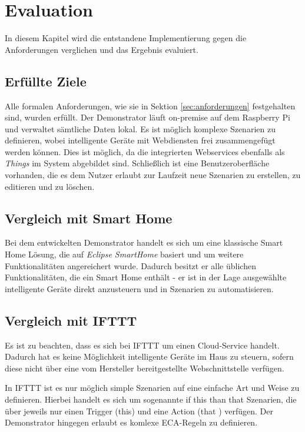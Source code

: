 \chapter{Evaluation}
\label{chap:eval}
In diesem Kapitel wird die entstandene Implementierung gegen die Anforderungen verglichen und das Ergebnis evaluiert.

\section{Erfüllte Ziele}
Alle formalen Anforderungen, wie sie in Sektion \ref{sec:anforderungen} festgehalten sind, wurden erfüllt. Der Demonstrator läuft on-premise auf dem Raspberry Pi und verwaltet sämtliche Daten lokal. Es ist möglich komplexe Szenarien zu definieren, wobei intelligente Geräte mit Webdiensten frei zusammengefügt werden können. Dies ist möglich, da die integrierten Webservices ebenfalls als \textit{Things} im System abgebildet sind. Schließlich ist eine Benutzeroberfläche vorhanden, die es dem Nutzer erlaubt zur Laufzeit neue Szenarien zu erstellen, zu editieren und zu löschen.

\section{Vergleich mit Smart Home}
Bei dem entwickelten Demonstrator handelt es sich um eine klassische Smart Home Lösung, die auf \textit{Eclipse SmartHome} basiert und um weitere Funktionalitäten angereichert wurde. Dadurch besitzt er alle üblichen Funktionalitäten, die ein Smart Home enthält - er ist in der Lage ausgewählte intelligente Geräte direkt anzusteuern und in Szenarien zu automatisieren. 

\section{Vergleich mit IFTTT}
Es ist zu beachten, dass es sich bei IFTTT um einen Cloud-Service handelt. Dadurch hat es keine Möglichkeit intelligente Geräte im Haus zu steuern, sofern diese nicht über eine vom Hersteller bereitgestellte Webschnittstelle verfügen.

In IFTTT ist es nur möglich simple Szenarien auf eine einfache Art und Weise zu definieren. Hierbei handelt es sich um sogenannte \glqq if this than that\grqq{} Szenarien, die über jeweils nur einen Trigger (\glqq this\grqq) und eine Action (\glqq that \grqq) verfügen. Der Demonstrator hingegen erlaubt es komlexe ECA-Regeln zu definieren.

